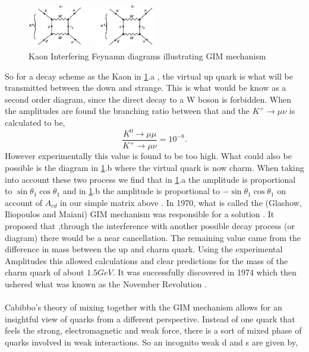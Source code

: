 \begin{figure}[h]
\centering
\includegraphics[width=0.5\textwidth]{figs/ckmfig3.jpg}
\caption{Kaon Interfering Feynamn diagrams illustrating GIM mechanism}
\label{fey2}
\end{figure}


So for a decay scheme as the Kaon in \cref{fey2}.a , the virtual up quark is what will be transmitted between the down and strange. This is what would be know as a second order diagram, since the direct decay to a W boson is forbidden. When the amplitudes are found the branching ratio between that and the $K^+\rightarrow\mu\nu$ is calculated to be,
\begin{equation}\label{mat3}
 \frac{K^0\rightarrow\mu\mu}{K^+\rightarrow\mu\nu}=10^{-8}.
\end{equation}
However experimentally this value is found to be too high. What could also be possible is the diagram in \cref{fey2}.b where the virtual quark is now charm. When taking into account these two process we find that in \cref{fey2}.a the amplitude is proportional to $\sin\theta_1 \cos\theta_1$ and in \cref{fey2}.b the amplitude is proportional to $-\sin\theta_1 \cos\theta_1$ on account of $A_{cd}$ in our simple matrix above \cite{CKM5}. 
In 1970, what is called the (Glashow, Iliopoulos and Maiani) GIM mechanism was responsible for a solution \cite{CKM9}. It proposed that ,through the interference with another possible decay process (or diagram) there would be a near cancellation. The remaining value came from the difference in mass between the up and charm quark. Using the experimental Amplitudes this allowed calculations and clear predictions for the mass of the charm quark of about $1.5GeV$. It was successfully discovered in 1974 which then ushered what was known as the November Revolution \cite{CKM2}.
 \\
\\
Cabibbo's theory of mixing together with the GIM mechanism allows for an insightful view of quarks from a different perspective. Instead of one quark that feels the strong, electromagnetic and weak force, there is a sort of mixed phase of quarks involved in weak interactions. So an incognito weak d and s are given by,

